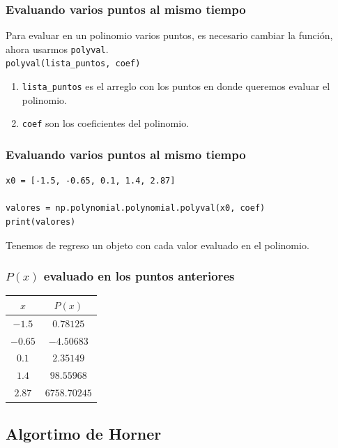 \documentclass[12pt]{beamer}
\begin{document}
\begin{frame}
\frametitle{Evaluando varios puntos al mismo tiempo}
Para evaluar en un polinomio varios puntos, es necesario cambiar la función, \pause ahora usarmos \texttt{polyval}.
\\
\bigskip
\pause
\texttt{polyval(lista\_puntos, coef)}
\begin{enumerate}[<+->]
\item \texttt{lista\_puntos} es el arreglo con los puntos en donde queremos evaluar el polinomio.
\item \texttt{coef} son los coeficientes del polinomio.
\end{enumerate}
\end{frame}
\begin{frame}[fragile]
\frametitle{Evaluando varios puntos al mismo tiempo}
\begin{lstlisting}[caption=Evaluando los puntos con polyval]
x0 = [-1.5, -0.65, 0.1, 1.4, 2.87]

valores = np.polynomial.polynomial.polyval(x0, coef)
print(valores)
\end{lstlisting}
\pause
Tenemos de regreso un objeto  con cada valor evaluado en el polinomio.
\end{frame}
\begin{frame}
\frametitle{$P (x)$ evaluado en los puntos anteriores}
\begin{table}
\centering
\begin{tabular}{c | c}
$x$ & $P (x)$ \\ \hline
$-1.5$ & $0.78125$ \\ \hline
$-0.65$ & $-4.50683$ \\ \hline
$0.1$ & $2.35149$ \\ \hline
$1.4$ & $98.55968$ \\ \hline
$2.87$ & $6758.70245$
\end{tabular}
\end{table}
\end{frame}

\subsection{Algortimo de Horner}
\end{document}
